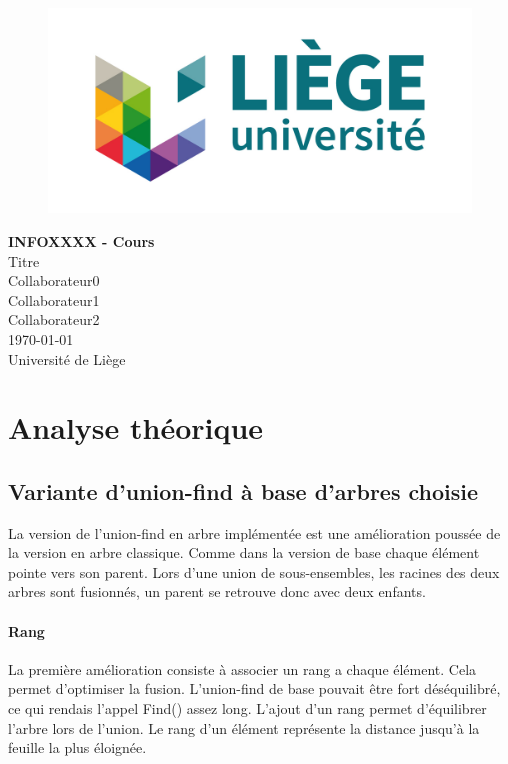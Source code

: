 \documentclass[11pt]{article}
\begin{document}
\begin{titlepage}

   \begin{figure}[htbp]
      \centering
      \includegraphics{uliege-logo-couleurs-300.jpg}
   \end{figure}
  	
  	\hfill

	\begin{center}
		\vfill
		\textbf{
		\Huge{INFOXXXX - Cours}}\\
		\bigskip
		\huge{Titre}\\
		\bigskip %
		\smallskip
		\Large{Collaborateur0\\Collaborateur1\\Collaborateur2} \\
		\bigskip
		\smallskip
		\large{\today}\\%
		\vfill
		\large{Université de Liège}
	\end{center}
\end{titlepage}
\clearpage
\clearpage
\section{Analyse théorique}
	\subsection{Variante d'union-find à base d'arbres choisie}
	La version de l'union-find en arbre implémentée est une amélioration poussée de la version en arbre classique. Comme dans la version de base chaque élément pointe vers son parent.
	Lors d'une union de sous-ensembles, les racines des deux arbres sont fusionnés, un parent se retrouve donc avec deux enfants.
	
	\paragraph{Rang}			
	La première amélioration consiste à associer un rang a chaque élément. Cela permet d'optimiser la fusion. L'union-find de base pouvait être fort déséquilibré, ce qui rendais l'appel Find() assez long. L'ajout d'un rang permet d'équilibrer l'arbre lors de l'union. Le rang d'un élément représente la distance jusqu'à la feuille la plus éloignée. 
	
\end{document}
